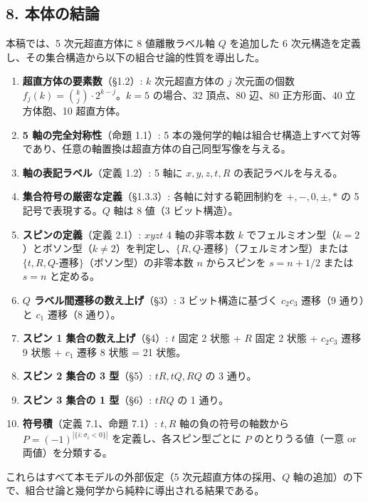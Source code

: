 \documentclass[
  a4paper,11pt]{ltjsarticle}
\providecommand{\tightlist}{%
  \setlength{\itemsep}{0pt}\setlength{\parskip}{0pt}}
\theoremstyle{definition}
\theoremstyle{remark}
\begin{document}
\subsection{8. 本体の結論}\label{ux672cux4f53ux306eux7d50ux8ad6}

本稿では、5 次元超直方体に 8 値離散ラベル軸 \(Q\) を追加した 6
次元構造を定義し、その集合構造から以下の組合せ論的性質を導出した。

\begin{enumerate}
\def\labelenumi{\arabic{enumi}.}
\tightlist
\item
  \textbf{超直方体の要素数}（§1.2）: \(k\) 次元超直方体の \(j\)
  次元面の個数 \(f_j(k) = \binom{k}{j} \cdot 2^{k-j}\)。\(k = 5\)
  の場合、32 頂点、80 辺、80 正方形面、40 立方体胞、10 超直方体。
\item
  \textbf{5 軸の完全対称性}（命題 1.1）: 5
  本の幾何学的軸は組合せ構造上すべて対等であり、任意の軸置換は超直方体の自己同型写像を与える。
\item
  \textbf{軸の表記ラベル}（定義 1.2）: 5 軸に \(x, y, z, t, R\)
  の表記ラベルを与える。
\item
  \textbf{集合符号の厳密な定義}（§1.3.3）: 各軸に対する範囲制約を
  \(+, -, 0, \pm, *\) の 5 記号で表現する。\(Q\) 軸は 8 値（3
  ビット構造）。
\item
  \textbf{スピンの定義}（定義 2.1）: \(xyzt\) 4 軸の非零本数 \(k\)
  でフェルミオン型（\(k = 2\)）とボソン型（\(k \neq 2\)）を判定し、\(\{R, Q\text{-遷移}\}\)（フェルミオン型）または
  \(\{t, R, Q\text{-遷移}\}\)（ボソン型）の非零本数 \(n\) からスピンを
  \(s = n + 1/2\) または \(s = n\) と定める。
\item
  \textbf{\(Q\) ラベル間遷移の数え上げ}（§3）: 3 ビット構造に基づく
  \(c_2 c_3\) 遷移（9 通り）と \(c_1\) 遷移（8 通り）。
\item
  \textbf{スピン 1 集合の数え上げ}（§4）: \(t\) 固定 2 状態 + \(R\) 固定
  2 状態 + \(c_2 c_3\) 遷移 9 状態 + \(c_1\) 遷移 8 状態 = 21 状態。
\item
  \textbf{スピン 2 集合の 3 型}（§5）: \(tR, tQ, RQ\) の 3 通り。
\item
  \textbf{スピン 3 集合の 1 型}（§6）: \(tRQ\) の 1 通り。
\item
  \textbf{符号積}（定義 7.1、命題 7.1）: \(t, R\) 軸の負の符号の軸数から
  \(P = (-1)^{|\{i : \sigma_i < 0\}|}\) を定義し、各スピン型ごとに \(P\)
  のとりうる値（一意 or 両値）を分類する。
\end{enumerate}

これらはすべて本モデルの外部仮定（5 次元超直方体の採用、\(Q\)
軸の追加）の下で、組合せ論と幾何学から純粋に導出される結果である。
\end{document}
